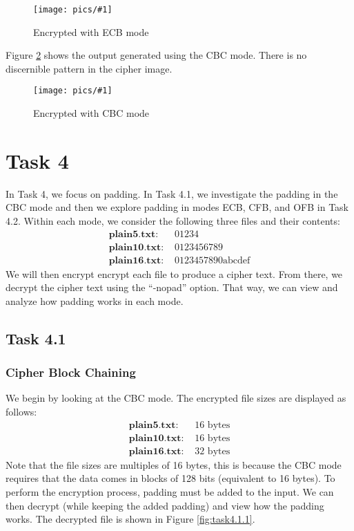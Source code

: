 \documentclass[11pt]{article}
\newcommand{\fig}[2]{ 
\begin{figure}[h]
	\centering
	\caption{#2}
	\texttt{[image: pics/\#1]}
	\label{fig:#1}
\end{figure} 
}
\begin{document}
\fig{task3.2.2}{Encrypted with ECB mode}

\newpage
Figure \ref{fig:task3.2.3} shows the output generated using the CBC mode. There is no discernible pattern in the cipher image.

\fig{task3.2.3}{Encrypted with CBC mode}

\newpage
\section*{Task 4}

In Task 4, we focus on padding. In Task 4.1, we investigate the padding in the CBC mode and then we explore padding in modes ECB, CFB, and OFB in Task 4.2. Within each mode, we consider the following three files and their contents:
\begin{align*}
\textbf{plain5.txt: }  & 01234 \\
\textbf{plain10.txt: } & 0123456789 \\
\textbf{plain16.txt: } & \text{0123457890abcdef}
\end{align*}
We will then encrypt encrypt each file to produce a cipher text. From there, we decrypt the cipher text using the ``-nopad'' option. That way, we can view and analyze how padding works in each mode.

\subsection*{Task 4.1}

\subsubsection*{Cipher Block Chaining}

We begin by looking at the CBC mode. The encrypted file sizes are displayed as follows:
\begin{align*}
\textbf{plain5.txt: }  & 16 \text{ bytes} \\
\textbf{plain10.txt: } & 16 \text{ bytes} \\
\textbf{plain16.txt: } & 32 \text{ bytes}
\end{align*}
Note that the file sizes are multiples of 16 bytes, this is because the CBC mode requires that the data comes in blocks of 128 bits (equivalent to 16 bytes). To perform the encryption process, padding must be added to the input. We can then decrypt (while keeping the added padding) and view how the padding works. The decrypted file is shown in Figure \ref{fig:task4.1.1}.
\end{document}
